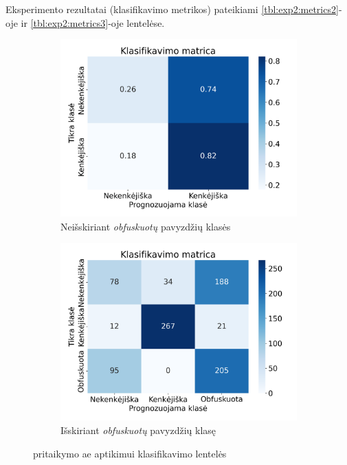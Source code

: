 Eksperimento rezultatai (klasifikavimo metrikos) pateikiami \ref{tbl:exp2:metrics2}-oje ir \ref{tbl:exp2:metrics3}-oje lentelėse.
\begin{figure}[h]
    \begin{subfigure}{0.5\textwidth}
        \centering
        \includegraphics[width=\textwidth]{images/lime_2x2.png}
        \caption{Neišskiriant \textit{obfuskuotų} pavyzdžių klasės}
        \label{fig:exp2:confusion:a}
    \end{subfigure}
    \begin{subfigure}{0.5\textwidth}
        \centering
        \includegraphics[width=\textwidth]{images/lime_3x3.png}
        \caption{Išskiriant \textit{obfuskuotų} pavyzdžių klasę}
        \label{fig:exp2:confusion:b}
    \end{subfigure}
    \caption{\LIME pritaikymo \gls{ae} aptikimui klasifikavimo lentelės}
    \label{fig:exp2:confusion}
\end{figure}

